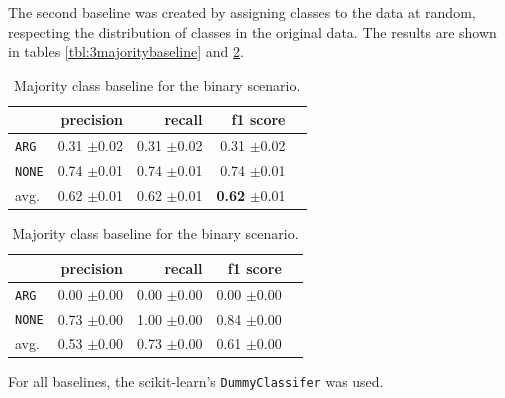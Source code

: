 The second baseline was created by assigning classes to the data at random, respecting the distribution of classes in the original data. The results are shown in tables \ref{tbl:3majoritybaseline} and \ref{tbl:binstrat}.



\begin{table}[!htb]
	\begin{minipage}{.5\linewidth}
		\caption{Random (stratified) baseline for the binary scenario.}
		\label{tbl:binmaj}
		\centering
		      
		\begin{tabularx}{0.97\linewidth}{Xrrrr}
			\toprule
			              & precision                    & recall                       & f1 score                              \\ \midrule 
			\texttt{ARG}  & 0.31 \scriptsize{$\pm$0.02} & 0.31 \scriptsize{$\pm$0.02} & 0.31 \scriptsize{$\pm$0.02}          \\ 
			\texttt{NONE} & 0.74 \scriptsize{$\pm$0.01} & 0.74 \scriptsize{$\pm$0.01} & 0.74 \scriptsize{$\pm$0.01}          \\ 
			avg.       & 0.62 \scriptsize{$\pm$0.01} & 0.62 \scriptsize{$\pm$0.01} & \textbf{0.62} \scriptsize{$\pm$0.01} \\ 
			\bottomrule
		\end{tabularx}
		
	\end{minipage}%
	\begin{minipage}{.5\linewidth}
		\centering
		\caption{Majority class baseline for the binary scenario.}
		\label{tbl:binstrat}
		\begin{tabularx}{0.97\linewidth}{Xrrrr}
			\toprule
			              & precision                    & recall                       & f1 score                     \\ \midrule 
			\texttt{ARG}  & 0.00 \scriptsize{$\pm$0.00} & 0.00 \scriptsize{$\pm$0.00} & 0.00 \scriptsize{$\pm$0.00} \\ 
			\texttt{NONE} & 0.73 \scriptsize{$\pm$0.00} & 1.00 \scriptsize{$\pm$0.00} & 0.84 \scriptsize{$\pm$0.00} \\ 
			avg.       & 0.53 \scriptsize{$\pm$0.00} & 0.73 \scriptsize{$\pm$0.00} & 0.61 \scriptsize{$\pm$0.00} \\ 
			\bottomrule
		\end{tabularx}
	\end{minipage} 
\end{table}
For all baselines, the scikit-learn's \texttt{DummyClassifer} was used.

